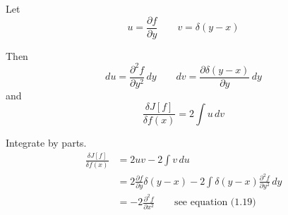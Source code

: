\documentclass[12pt]{article}
\begin{document}
Let
\begin{equation*}
u=\frac{\partial f}{\partial y}\qquad v=\delta(y-x)
\end{equation*}

Then
\begin{equation*}
du=\frac{\partial^2f}{\partial y^2}\,dy
\qquad
dv=\frac{\partial\delta(y-x)}{\partial y}\,dy
\end{equation*}
and
\begin{equation*}
\frac{\delta J[f]}{\delta f(x)}=2\int u\,dv
\end{equation*}

Integrate by parts.
\begin{align*}
\frac{\delta J[f]}{\delta f(x)}
&=2uv-2\int v\,du
\\
&=2\frac{\partial f}{\partial y}\delta(y-x)-2\int\delta(y-x)\frac{\partial^2f}{\partial y^2}\,dy
\\
&=-2\frac{\partial^2f}{\partial x^2}
\qquad\text{see equation (1.19)}
\end{align*}
\end{document}
